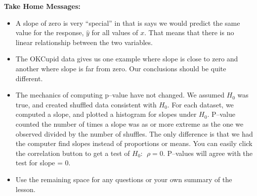 \begin{center}
  {\bf Take Home Messages:}\vspace{-.4cm}
\end{center}
\begin{itemize}
  \item A slope of zero is very ``special'' in that is says we would
    predict the same value for the response, $\hat{y}$ for all values
    of $x$.  That means that there is no linear relationship between
    the two variables.
  \item The OKCupid data gives us one example where slope is close to
    zero and another where slope is far from zero.  Our conclusions
    should be quite different.
  \item The mechanics of computing p--value have not changed.  We
    assumed $H_0$ was true, and created shuffled data consistent with
    $H_0$.  For each dataset, we computed a slope, and plotted a
    histogram for slopes under $H_0$. P--value counted the number of
    times a slope was as or more extreme as the one we observed
    divided by the number of shuffles.  The only difference is that we
    had the computer find slopes instead of proportions or means.  You
    can easily click the correlation button to get a test of $H_0:\ \
    \rho = 0$. P--values will agree with the test for slope = 0.
 \item 
  Use the remaining space for any questions or your own summary of the
  lesson. \vspace*{\fill}

\end{itemize}

